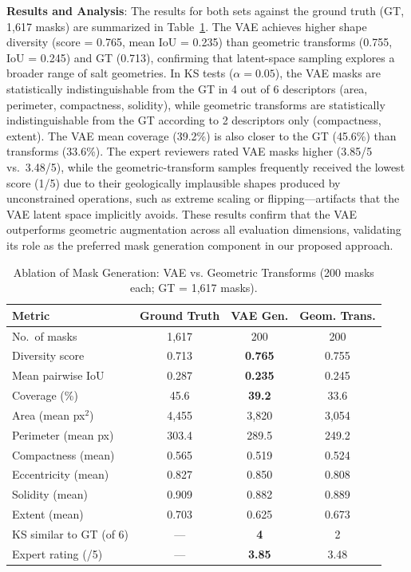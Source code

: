 \documentclass{ieeeaccess}
\begin{document}
\textbf{Results and Analysis}: The results for both sets against the ground truth (GT, 1,617 masks) are summarized in Table~\ref{tab:ablation_masks}. The VAE achieves higher shape diversity (score = 0.765, mean IoU = 0.235) than geometric transforms (0.755, IoU = 0.245) and GT (0.713), confirming that latent-space sampling explores a broader range of salt geometries. In KS tests ($\alpha = 0.05$), the VAE masks are statistically indistinguishable from the GT in 4 out of 6 descriptors (area, perimeter, compactness, solidity), while geometric transforms are statistically indistinguishable from the GT according to 2 descriptors only (compactness, extent). The VAE mean coverage (39.2\%) is also closer to the GT (45.6\%) than transforms (33.6\%). The expert reviewers rated VAE masks higher (3.85/5 vs.\ 3.48/5), while the geometric-transform samples frequently received the lowest score (1/5) due to their geologically implausible shapes produced by unconstrained operations, such as extreme scaling or flipping---artifacts that the VAE latent space implicitly avoids. These results confirm that the VAE outperforms geometric augmentation across all evaluation dimensions, validating its role as the preferred mask generation component in our proposed approach.

\begin{table}[!t]
\caption{Ablation of Mask Generation: VAE vs. Geometric Transforms (200 masks each; GT = 1,617 masks).}
\label{tab:ablation_masks}
\centering
\begin{tabular}{lccc}
\toprule
\textbf{Metric} & \textbf{Ground Truth} & \textbf{VAE Gen.} & \textbf{Geom. Trans.} \\
\midrule
No.\ of masks            & 1,617  & 200    & 200    \\
Diversity score          & 0.713  & \textbf{0.765}  & 0.755  \\
Mean pairwise IoU        & 0.287  & \textbf{0.235}  & 0.245  \\
Coverage (\%)            & 45.6   & \textbf{39.2}   & 33.6   \\
\midrule
Area (mean px$^2$)       & 4,455  & 3,820  & 3,054  \\
Perimeter (mean px)      & 303.4  & 289.5  & 249.2  \\
Compactness (mean)       & 0.565  & 0.519  & 0.524  \\
Eccentricity (mean)      & 0.827  & 0.850  & 0.808  \\
Solidity (mean)          & 0.909  & 0.882  & 0.889  \\
Extent (mean)            & 0.703  & 0.625  & 0.673  \\
\midrule
KS similar to GT (of 6)  & ---    & \textbf{4}      & 2      \\
Expert rating (/5)       & ---    & \textbf{3.85}   & 3.48     \\
\bottomrule
\end{tabular}
\end{table}
\end{document}
